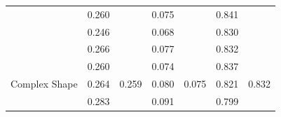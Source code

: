 \documentclass[conference]{IEEEtran}
\begin{document}
\begin{table}[]
\begin{tabular}{|l|cc|cc|cc|}
                                                      & \multicolumn{1}{c|}{0.260}                         & \cellcolor[HTML]{FFFFFF}                         & \multicolumn{1}{c|}{0.075}                         & \cellcolor[HTML]{FFFFFF}                           & \multicolumn{1}{c|}{0.841}                         & \cellcolor[HTML]{FFFFFF}                        \\ \cline{2-2} \cline{4-4} \cline{6-6}
                                                      & \multicolumn{1}{l|}{0.246}                         & \cellcolor[HTML]{FFFFFF}                         & \multicolumn{1}{l|}{0.068}                         & \cellcolor[HTML]{FFFFFF}                           & \multicolumn{1}{l|}{0.830}                         & \cellcolor[HTML]{FFFFFF}                        \\ \cline{2-2} \cline{4-4} \cline{6-6}
                                                      & \multicolumn{1}{l|}{0.266}                         & \cellcolor[HTML]{FFFFFF}                         & \multicolumn{1}{l|}{0.077}                          & \cellcolor[HTML]{FFFFFF}                           & \multicolumn{1}{l|}{0.832}                         & \cellcolor[HTML]{FFFFFF}                        \\ \cline{2-2} \cline{4-4} \cline{6-6}
                                                      & \multicolumn{1}{l|}{0.260}                         & \cellcolor[HTML]{FFFFFF}                         & \multicolumn{1}{l|}{0.074}                         & \cellcolor[HTML]{FFFFFF}                           & \multicolumn{1}{l|}{0.837}                         & \cellcolor[HTML]{FFFFFF}                        \\ \cline{2-2} \cline{4-4} \cline{6-6}
  \multirow{-5}{*}{Complex Shape}         & \multicolumn{1}{l|}{0.264}                         & \multirow{-5}{*}{\cellcolor[HTML]{FFFFFF}0.259} & \multicolumn{1}{l|}{0.080}                         & \multirow{-5}{*}{\cellcolor[HTML]{FFFFFF}0.075} & \multicolumn{1}{l|}{0.821}                         & \multirow{-5}{*}{\cellcolor[HTML]{FFFFFF}0.832} \\ \hline
                                                      & \multicolumn{1}{c|}{\cellcolor[HTML]{FFFFFF}0.283} & \cellcolor[HTML]{FFFFFF}                         & \multicolumn{1}{c|}{\cellcolor[HTML]{FFFFFF}0.091} & \cellcolor[HTML]{FFFFFF}                           & \multicolumn{1}{c|}{\cellcolor[HTML]{FFFFFF}0.799} & \cellcolor[HTML]{FFFFFF}                        \\ \cline{2-2} \cline{4-4} \cline{6-6}

\end{tabular}
\end{table}
\end{document}
